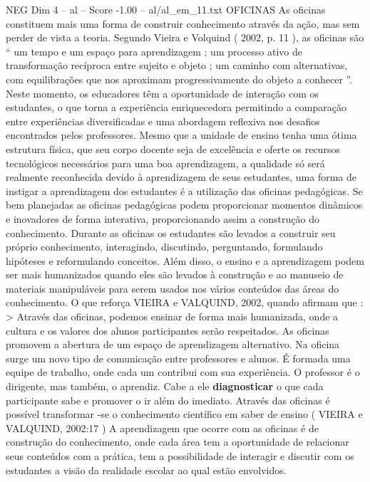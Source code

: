 \begin{textsample}{NEG Dim 4 – al – Score -1.00 – al/al\_em\_11.txt}  \label{ex:f4_neg_246}
OFICINAS As oficinas constituem mais uma forma de construir conhecimento através da ação, mas sem perder de vista a teoria.
Segundo Vieira e Volquind ( 2002, p. 11 ), as oficinas são “ um tempo e um espaço para aprendizagem ; um processo ativo de transformação recíproca entre sujeito e objeto ; um caminho com alternativas, com equilibrações que nos aproximam progressivamente do objeto a conhecer ”.
Neste momento, os educadores têm a oportunidade de interação com os estudantes, o que torna a experiência enriquecedora permitindo a comparação entre experiências diversificadas e uma abordagem reflexiva nos desafios encontrados pelos professores.
Mesmo que a unidade de ensino tenha uma ótima estrutura física, que seu corpo docente seja de excelência e oferte os recursos tecnológicos necessários para uma boa aprendizagem, a qualidade só será realmente reconhecida devido à aprendizagem de seus estudantes, uma forma de instigar a aprendizagem dos estudantes é a utilização das oficinas pedagógicas.
Se bem planejadas as oficinas pedagógicas podem proporcionar momentos dinâmicos e inovadores de forma interativa, proporcionando assim a construção do conhecimento.
Durante as oficinas os estudantes são levados a construir seu próprio conhecimento, interagindo, discutindo, perguntando, formulando hipóteses e reformulando conceitos.
Além disso, o ensino e a aprendizagem podem ser mais humanizados quando eles são levados à construção e ao manuseio de materiais manipuláveis para serem usados nos vários conteúdos das áreas do conhecimento.
O que reforça VIEIRA e VALQUIND, 2002, quando afirmam que : > Através das oficinas, podemos ensinar de forma mais humanizada, onde a cultura e os valores dos alunos participantes serão respeitados.
As oficinas promovem a abertura de um espaço de aprendizagem alternativo.
Na oficina surge um novo tipo de comunicação entre professores e alunos.
É formada uma equipe de trabalho, onde cada um contribui com sua experiência.
O professor é o dirigente, mas também, o aprendiz.
Cabe a ele \textbf{diagnosticar} o que cada participante sabe e promover o ir além do imediato.
Através das oficinas é possível transformar -se o conhecimento científico em saber de ensino ( VIEIRA e VALQUIND, 2002:17 ) A aprendizagem que ocorre com as oficinas é de construção do conhecimento, onde cada área tem a oportunidade de relacionar seus conteúdos com a prática, tem a possibilidade de interagir e discutir com os estudantes a visão da realidade escolar ao qual estão envolvidos.

\end{textsample}
